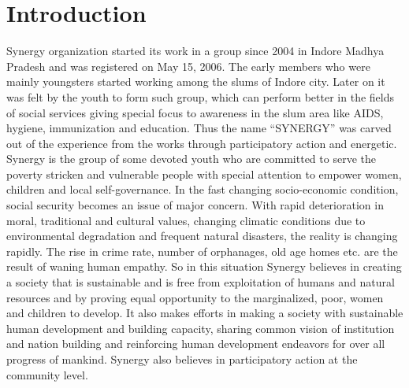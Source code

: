 \chapter{Introduction}
\ifpdf
    \graphicspath{{Introduction/IntroductionFigs/PNG/}{Introduction/IntroductionFigs/PDF/}{Introduction/IntroductionFigs/}}
\else
    \graphicspath{{Introduction/IntroductionFigs/EPS/}{Introduction/IntroductionFigs/}}
\fi

Synergy organization started its work in a group since 2004 in Indore Madhya Pradesh and was registered on May 15, 2006. The early members who were mainly youngsters started working among the slums of Indore city. Later on it was felt by the youth to form such group, which can perform better in the fields of social services giving special focus to awareness in the slum area like AIDS, hygiene, immunization and education. Thus the name ``SYNERGY'' was carved out of the experience from the works through participatory action and energetic. \newline
Synergy is the group of some devoted youth who are committed to serve the poverty stricken and vulnerable people with special attention to empower women, children and local self-governance. In the fast changing socio-economic condition, social security becomes an issue of major concern. With rapid deterioration in moral, traditional and cultural values, changing climatic conditions due to environmental degradation and frequent natural disasters, the reality is changing rapidly. The rise in crime rate, number of orphanages, old age homes etc. are the result of waning human empathy. So in this situation Synergy believes in creating a society that is sustainable and is free from exploitation of humans and natural resources and by proving equal opportunity to the marginalized, poor, women and children to develop. It also makes efforts in making a society with sustainable human development and building capacity, sharing common vision of institution and nation building and reinforcing human development endeavors for over all progress of mankind. Synergy also believes in participatory action at the community level.


